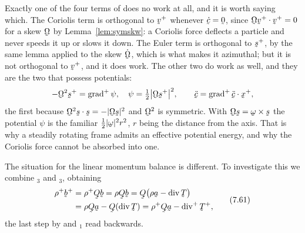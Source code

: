 \begin{remark}
Exactly one of the four terms of  does no work at all, and it
is worth saying which. The Coriolis term is orthogonal to $\bv^{+}$
whenever $\dot\bc=\bze$, since $\ip{\bOm\bv^{+}}{\bv^{+}}=0$ for a skew
$\bOm$ by Lemma~\ref{lem:symskw}: a Coriolis force deflects a particle
and never speeds it up or slows it down. The Euler term is orthogonal to
$\bs^{+}$, by the same lemma applied to the skew $\dot\bOm$, which is
what makes it azimuthal; but it is not orthogonal to $\bv^{+}$, and it
does work. The other two do work as well, and they are the two that
possess potentials:
\[
   -\bOm^{2}\bs^{+}=\grad^{+}\psi ,\quad
   \psi=\tfrac12\big|\bOm\bs^{+}\big|^{2},
   \qquad
   \ddot\bc=\grad^{+}\ip{\ddot\bc}{\bx^{+}},
\]
the first because $\ip{\bOm^{2}\bs}{\bs}=-|\bOm\bs|^{2}$ and $\bOm^{2}$
is symmetric. With $\bOm\bs=\bom\times\bs$ the potential $\psi$ is the
familiar $\tfrac12|\bom|^{2}r^{2}$, $r$ being the distance from the axis.
That is why a steadily rotating frame admits an effective potential
energy, and why the Coriolis force cannot be absorbed into one.
\end{remark}

The situation for the linear momentum balance is different. To
investigate this we combine $_{3}$ and $_{3}$,
obtaining
\begin{equation}
\begin{aligned}
   \rho^{+}\bb^{+}&=\rho^{+}\bQ\bb=\rho\bQ\bb
    =\bQ\big(\rho\ba-\dvg\bT\big)\\
   &=\rho\bQ\ba-\bQ(\dvg\bT)=\rho^{+}\bQ\ba-\dvg^{+}\bT^{+},
\end{aligned}
   \tag{7.61}\label{eq:7.61}
\end{equation}
the last step by  and $_{1}$ read backwards.

